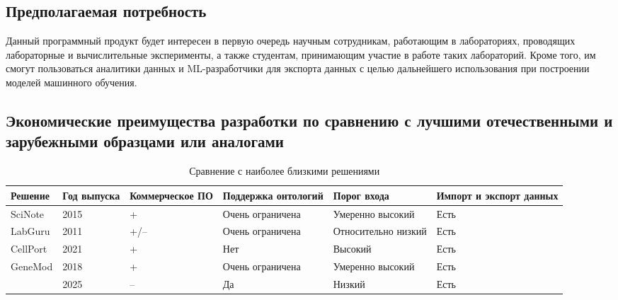 \documentclass[a4paper,12pt,reqno]{article}
\begin{document}
    \subsection{Предполагаемая потребность}
    Данный программный продукт будет интересен в первую очередь научным сотрудникам, работающим в лабораториях, проводящих лабораторные и вычислительные эксперименты, а также студентам, принимающим участие в работе таких лабораторий. Кроме того, им смогут пользоваться аналитики данных и ML-разработчики для экспорта данных с целью дальнейшего использования при построении моделей машинного обучения.

    \subsection{Экономические преимущества разработки по сравнению с лучшими отечественными и зарубежными образцами или аналогами}
    \begin{table}[h!]
        \begin{tabular}{|p{3cm}|p{1.5cm}|p{2.5cm}|p{2cm}|p{2.5cm}|p{2.5cm}|}
            \hline
            Решение                          & Год выпуска & Коммерческое ПО & Поддержка онтологий & Порог входа         & Импорт и экспорт данных \\
            \hline
            SciNote                          & 2015        & +               & Очень ограничена    & Умеренно высокий    & Есть                    \\
            \hline
            LabGuru                          & 2011        & +/--            & Очень ограничена    & Относительно низкий & Есть                    \\
            \hline
            CellPort                         & 2021        & +               & Нет                 & Высокий             & Есть                    \\
            \hline
            GeneMod                          & 2018        & +               & Очень ограничена    & Умеренно высокий    & Есть                    \\
            \hline
            \unskip & 2025        & --              & Да                  & Низкий              & Есть                    \\
            \hline
        \end{tabular}
        \caption{Сравнение с наиболее близкими решениями}
        \label{tab:Табл. 1}
    \end{table}
\end{document}
